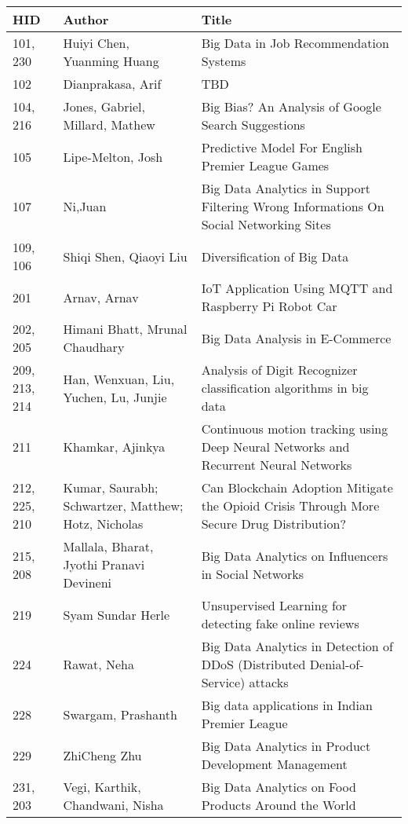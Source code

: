 \documentclass[12pt]{book}
\begin{document}
\begin{footnotesize}
\begin{longtable}{|p{1cm}p{5cm}p{9cm}|}
\hline \textbf{HID} & \textbf{Author} & \textbf{Title} \\ \hline \hline

101, 230 & Huiyi Chen, Yuanming Huang & Big Data in Job Recommendation Systems  \\
\hline
102 & Dianprakasa, Arif & TBD  \\
\hline
104, 216 & Jones, Gabriel, Millard, Mathew & Big Bias? An Analysis of Google Search Suggestions  \\
\hline
105 & Lipe-Melton, Josh & Predictive Model For English Premier League Games  \\
\hline
107 & Ni,Juan & Big Data Analytics in Support Filtering Wrong Informations On Social Networking Sites  \\
\hline
109, 106 & Shiqi Shen, Qiaoyi Liu & Diversification of Big Data  \\
\hline
201 & Arnav, Arnav & IoT Application Using MQTT and Raspberry Pi Robot Car  \\
\hline
202, 205 & Himani Bhatt, Mrunal Chaudhary & Big Data Analysis in E-Commerce  \\
\hline
209, 213, 214 & Han, Wenxuan, Liu, Yuchen, Lu, Junjie & Analysis of Digit Recognizer classification algorithms in big data  \\
\hline
211 & Khamkar, Ajinkya & Continuous motion tracking using Deep Neural Networks and Recurrent Neural Networks  \\
\hline
212, 225, 210 & Kumar, Saurabh; Schwartzer, Matthew; Hotz, Nicholas & Can Blockchain Adoption Mitigate the Opioid Crisis Through More Secure Drug Distribution?  \\
\hline
215, 208 & Mallala, Bharat, Jyothi Pranavi Devineni & Big Data Analytics on Influencers in Social Networks  \\
\hline
219 & Syam Sundar Herle & Unsupervised Learning for detecting fake online reviews  \\
\hline
224 & Rawat, Neha & Big Data Analytics in Detection of DDoS (Distributed Denial-of-Service) attacks
  \\
\hline
228 & Swargam, Prashanth & Big data applications in Indian Premier League  \\
\hline
229 & ZhiCheng Zhu & Big Data Analytics in Product Development Management  \\
\hline
231, 203 & Vegi, Karthik, Chandwani, Nisha & Big Data Analytics on Food Products Around the World  \\

\end{longtable}
\end{footnotesize}
\end{document}
